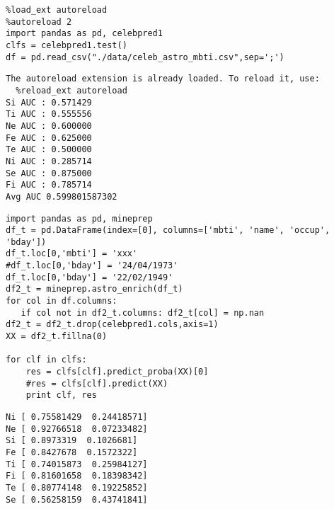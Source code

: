 \documentclass[12pt,fleqn]{article}\usepackage{../common}
\begin{document}
\begin{verbatim}
%load_ext autoreload
%autoreload 2
import pandas as pd, celebpred1
clfs = celebpred1.test()
df = pd.read_csv("./data/celeb_astro_mbti.csv",sep=';')
\end{verbatim}

\begin{verbatim}
The autoreload extension is already loaded. To reload it, use:
  %reload_ext autoreload
Si AUC : 0.571429
Ti AUC : 0.555556
Ne AUC : 0.600000
Fe AUC : 0.625000
Te AUC : 0.500000
Ni AUC : 0.285714
Se AUC : 0.875000
Fi AUC : 0.785714
Avg AUC 0.599801587302
\end{verbatim}


\begin{verbatim}
import pandas as pd, mineprep
df_t = pd.DataFrame(index=[0], columns=['mbti', 'name', 'occup', 'bday'])
df_t.loc[0,'mbti'] = 'xxx'
#df_t.loc[0,'bday'] = '24/04/1973'
df_t.loc[0,'bday'] = '22/02/1949'
df2_t = mineprep.astro_enrich(df_t)
for col in df.columns: 
   if col not in df2_t.columns: df2_t[col] = np.nan
df2_t = df2_t.drop(celebpred1.cols,axis=1)
XX = df2_t.fillna(0)

for clf in clfs: 
    res = clfs[clf].predict_proba(XX)[0]
    #res = clfs[clf].predict(XX)
    print clf, res
\end{verbatim}

\begin{verbatim}
Ni [ 0.75581429  0.24418571]
Ne [ 0.92766518  0.07233482]
Si [ 0.8973319  0.1026681]
Fe [ 0.8427678  0.1572322]
Ti [ 0.74015873  0.25984127]
Fi [ 0.81601658  0.18398342]
Te [ 0.80774148  0.19225852]
Se [ 0.56258159  0.43741841]
\end{verbatim}
\end{document}
